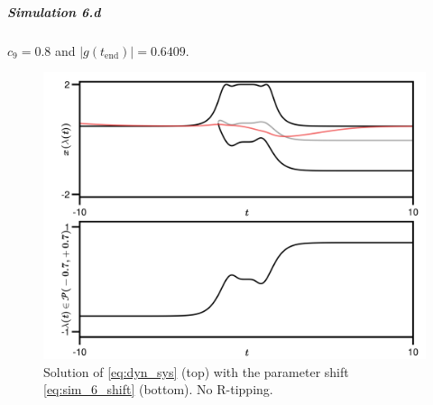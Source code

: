 \documentclass[../main.tex]{subfiles}
\begin{document}
\subparagraph{Simulation 6.d}\label{subpar:sim_6_d}

$c_{9}=0.8$ and $|g(t_{\text{end}})| = 0.6409$.

\begin{figure}[H]
    \centering 
    \includegraphics[keepaspectratio, width=\textwidth]{../figures/sim_6.d.png}
    \caption{Solution of \eqref{eq:dyn_sys} (top) with the parameter shift \eqref{eq:sim_6_shift} (bottom). No R-tipping.}
    \label{fig:sim_6_d}
\end{figure}
\end{document}
